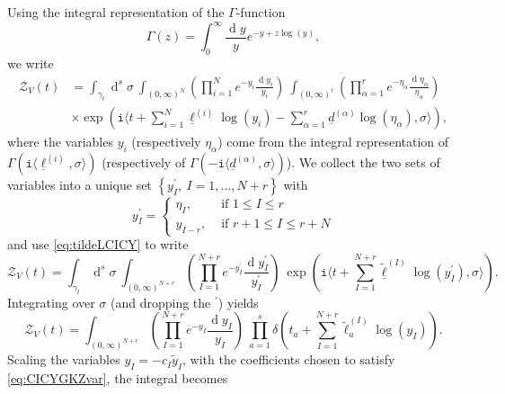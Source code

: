 \documentclass[12pt,a4paper,oneside]{amsart}
\numberwithin{equation}{section}
\theoremstyle{definition}
\theoremstyle{remark}
\DeclareMathOperator{\dd}{d}
\newcommand{\mz}{\mathcal{Z}}
\newcommand{\ii}{\mathtt{i}}
\begin{document}
\begin{appendix}
Using the integral representation of the $\Gamma$-function 
\begin{equation}
\label{eq:gammaint}
	\Gamma (z) = \int_0 ^{\infty} \frac{\dd y}{y} e^{-y + z \log (y)} ,
\end{equation}
we write 
\begin{equation*}
\begin{aligned}
	\mz_{V} \left( t \right)  &= \int_{\gamma_t} \dd^s \sigma~ \int_{(0,\infty)^{N}} \left( \prod_{i=1}^{N} e^{-y_i}  \frac{\dd y_i}{y_i} \right) ~ \int_{(0,\infty)^{r}} \left( \prod_{\alpha=1}^{r} e^{-\eta_{\alpha}}  \frac{\dd \eta_{\alpha}}{\eta_{\alpha}} \right) \\
	& \times \exp \left( \ii \langle t + \sum_{i=1}^{N} \underline{\ell}^{(i)} \log (y_i) - \sum_{\alpha=1}^{r} \underline{d}^{(\alpha)} \log (\eta_{\alpha}) , \sigma\rangle  \right) ,
\end{aligned}
\end{equation*}
where the variables $y_i$ (respectively $\eta_{\alpha}$) come from the integral representation of $\Gamma \left(  \ii \langle \underline{\ell}^{(i)}, \sigma \rangle \right)$ (respectively of $\Gamma \left(- \ii \langle\underline{d}^{(\alpha)}, \sigma \rangle \right)$). We collect the two sets of variables into a unique set $\left\{ y_{I}^{\prime}, \ I=1, \dots, N+r\right\}$ with 
\begin{equation}
\label{eq:changeetaytoyI}
	y_{I}^{\prime} = \begin{cases} \eta_{I} , & \text{ if } 1 \le I \le r \\ y_{I-r}  , & \text{ if } r+1 \le I \le r+N \end{cases}
\end{equation}
and use \eqref{eq:tildeLCICY} to write 
\begin{equation*}
	\mz_{V} \left( t \right)  = \int_{\gamma_t} \dd^s \sigma~ \int_{(0,\infty)^{N+r}} \left( \prod_{I=1}^{N+r} e^{-y_I^{\prime}}  \frac{\dd y_I^{\prime}}{y_I^{\prime}} \right) ~ \exp \left( \ii \langle t + \sum_{I=1}^{N+r} \underline{\tilde{\ell}}^{(I)} \log (y_I^{\prime}) , \sigma\rangle  \right) .
\end{equation*}
Integrating over $\sigma$ (and dropping the ${}^{\prime}$) yields 
\begin{equation*}
	\mz_{V} \left( t \right)  = \int_{(0,\infty)^{N+r}} \left( \prod_{I=1}^{N+r} e^{-y_I}  \frac{\dd y_I}{y_I} \right) ~ \prod_{a=1}^{s} \delta \left( t_a + \sum_{I=1}^{N+r} \tilde{\ell}_a^{(I)} \log (y_I) \right) .
\end{equation*}
Scaling the variables $y_I = - c_I \tilde{y}_I$, with the coefficients chosen to satisfy \eqref{eq:CICYGKZvar}, the integral becomes 

\end{appendix}
\end{document}
